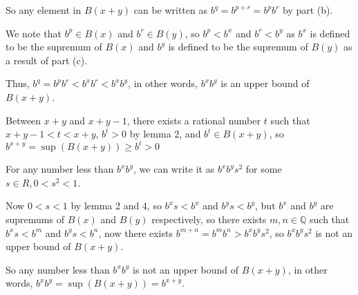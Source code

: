 So any element in $ B(x+y) $ can be written as $ b^q = b^{p + r} = b^p b^r $ by part (b).

We note that $ b^p \in B(x) $ and $ b^r \in B(y) $, so $ b^p < b^x $ and $ b^r < b^y $ as $ b^x $ is defined to be the supremum of $ B(x) $ and $ b^y $ is defined to be the supremum of $ B(y) $ as a result of part (c).

Thus, $ b^q = b^p b^r < b^x b^r < b^x b^y $, in other words, $ b^x b^y $ is an upper bound of $ B(x+y) $.

Between $ x + y $ and $ x + y - 1 $, there exists a rational number $ t $ such that $ x + y - 1 < t < x + y $, $ b^t > 0 $ by lemma 2, and $ b^t \in B(x+y) $, so $ b^{x+y} = \sup(B(x+y)) \ge b^t > 0 $

For any number less than $ b^xb^y $, we can write it as $ b^xb^y s^2 $ for some $ s \in R, 0 < s^2 < 1 $.

Now $ 0 < s < 1 $ by lemma 2 and 4, so $ b^x s < b^x $ and $ b^y s < b^y $, but $ b^x $ and $ b^y $ are supremums of $ B(x) $ and $ B(y) $ respectively, so there exists $ m, n \in \mathbb{Q} $ such that $ b^x s < b^m $ and $ b^y s < b^n $, now there exists $ b^{m+n} = b^m b^n > b^x b^y s^2 $, so $ b^x b^y s^2 $ is not an upper bound of $ B(x+y) $.

So any number less than $ b^x b^y $ is not an upper bound of $ B(x+y) $, in other words, $ b^x b^y = \sup(B(x+y)) = b^{x+y}$.



